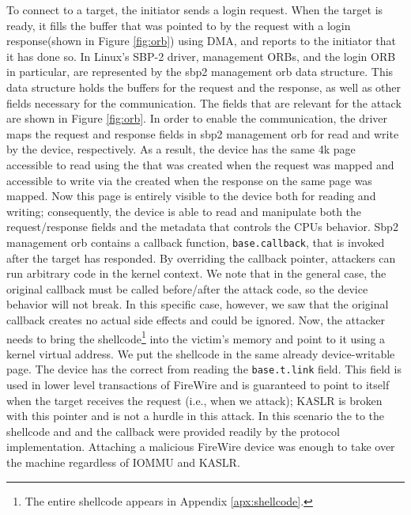 To connect to a target, the initiator sends a login request. When the target is ready, it fills the buffer that was pointed to by the request with a login response(shown in Figure \ref{fig:orb}) using DMA, and reports to the initiator that it has done so. In Linux’s SBP-2 driver, management ORBs, and the login ORB in particular, are represented by the sbp2 management orb data structure. This data structure holds the buffers for the request and the response, as well as other fields necessary for the communication. The fields that are relevant for the attack are shown in Figure \ref{fig:orb}. In order to enable the communication, the driver maps the request and response fields in sbp2 management orb for read and write by the device, respectively. As a result, the device has the same 4k page accessible to read using the \iova that was created when the request was mapped and accessible to write via the \iova created when the response on the same page was mapped. Now this page is entirely visible to the device both for reading and writing; consequently, the device is able to read and manipulate both the request/response fields and the metadata that controls the CPUs behavior. Sbp2 management orb contains a callback function, \texttt{base.callback}, that is invoked after the target has responded. By overriding the callback pointer, attackers can run arbitrary code in the kernel context. We note that in the general case, the original callback must be called before/after the attack code, so the device behavior will not break. In this specific case, however, we saw that the original callback creates no actual side effects and could be ignored. Now, the attacker needs to bring the shellcode\footnote{The entire shellcode appears in Appendix \ref{apx:shellcode}.} into the victim’s memory and point to it using a kernel virtual address. We put the shellcode in the same already device-writable page. The device has the correct \kva from reading the \texttt{base.t.link} field.  This field is used in lower level transactions of FireWire and is guaranteed to point to itself when the target receives the request (i.e., when we attack); KASLR is broken with this pointer and is not a hurdle in this attack. In this scenario the \kva to the shellcode and and the callback were provided readily by the  protocol implementation. Attaching a malicious FireWire device was enough to take over the machine regardless of IOMMU and KASLR. 

